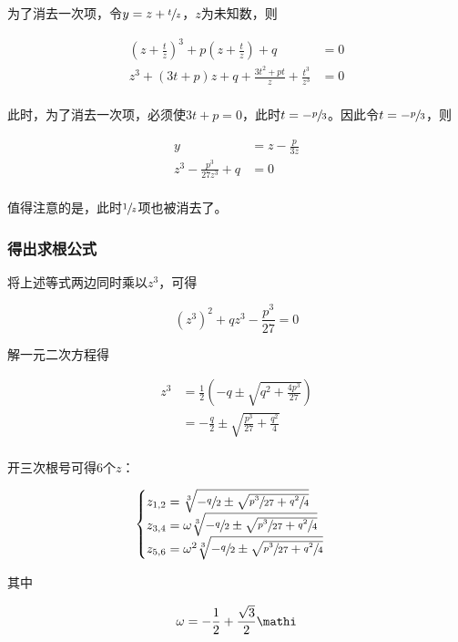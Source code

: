 为了消去一次项，令$y = z + \sfrac tz$，$z$为未知数，则

\begin{align*}
  \left(z + \frac tz\right)^3 + p\left(z + \frac tz\right) + q &= 0 \\
  z^3 + (3t + p)z + q + \frac{3t^2 + pt}z + \frac{t^3}{z^3} &= 0 \\
\end{align*}

此时，为了消去一次项，必须使$3t + p = 0$，此时$t = -\sfrac p3$。因此令$t = -\sfrac p3$，则

\begin{align*}
  y &= z - \frac p{3z} \\
  z^3 - \frac{p^3}{27z^3} + q &= 0 \\
\end{align*}

值得注意的是，此时$\sfrac 1z$项也被消去了。

\subsubsection{得出求根公式}

将上述等式两边同时乘以$z^3$，可得

\[ (z^3)^2 + qz^3 - \frac{p^3}{27} = 0 \]

解一元二次方程得

\begin{align*}
  z^3 &= \frac12\left(-q\pm\sqrt{q^2 + \frac{4p^3}{27}}\right) \\
  &= -\frac q2 \pm\sqrt{\frac{p^3}{27} + \frac{q^2}4} \\
\end{align*}

开三次根号可得6个$z$：

\begin{align*}
  \begin{cases}
    z_{1,2} = \sqrt[3]{-\sfrac q2 \pm\sqrt{\sfrac{p^3}{27} + \sfrac{q^2}4}} \\
    z_{3,4} = \omega\sqrt[3]{-\sfrac q2 \pm\sqrt{\sfrac{p^3}{27} + \sfrac{q^2}4}} \\
    z_{5,6} = \omega^2\sqrt[3]{-\sfrac q2 \pm\sqrt{\sfrac{p^3}{27} + \sfrac{q^2}4}} \\
  \end{cases}
\end{align*}

其中

\[ \omega = -\frac12 + \frac{\sqrt3}2\mathi \]

